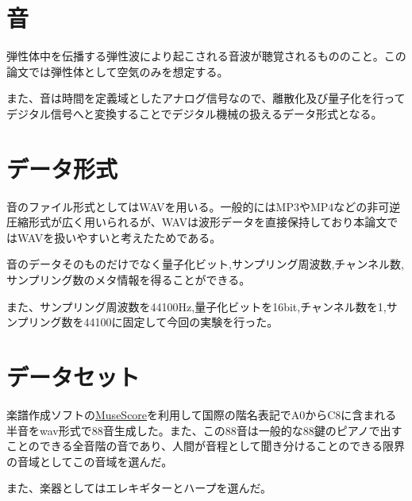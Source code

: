 \section{音}
弾性体中を伝播する弾性波により起こされる音波が聴覚されるもののこと。この論文では弾性体として空気のみを想定する。

また、音は時間を定義域としたアナログ信号なので、離散化及び量子化を行ってデジタル信号へと変換することでデジタル機械の扱えるデータ形式となる。




\section{データ形式}
音のファイル形式としてはWAVを用いる。一般的にはMP3やMP4などの非可逆圧縮形式が広く用いられるが、WAVは波形データを直接保持しており本論文ではWAVを扱いやすいと考えたためである。




音のデータそのものだけでなく量子化ビット,サンプリング周波数,チャンネル数,サンプリング数のメタ情報を得ることができる。

また、サンプリング周波数を44100Hz,量子化ビットを16bit,チャンネル数を1,サンプリング数を44100に固定して今回の実験を行った。

\section{データセット}

楽譜作成ソフトの\href{https://musescore.org/ja}{MuseScore}を利用して国際の階名表記でA0からC8に含まれる半音をwav形式で88音生成した。また、この88音は一般的な88鍵のピアノで出すことのできる全音階の音であり、人間が音程として聞き分けることのできる限界の音域としてこの音域を選んだ。


また、楽器としてはエレキギターとハープを選んだ。